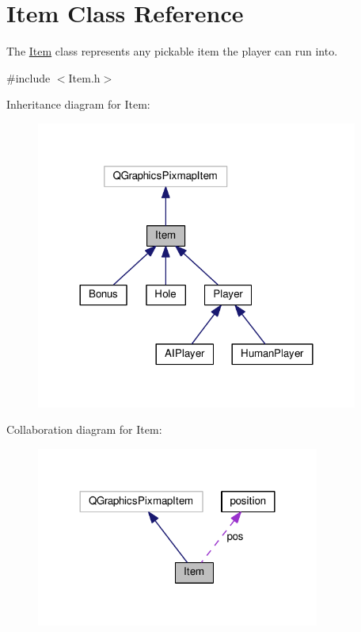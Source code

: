 \hypertarget{class_item}{}\section{Item Class Reference}
\label{class_item}


The \hyperlink{class_item}{Item} class represents any pickable item the player can run into.  




{\ttfamily \#include $<$Item.\+h$>$}



Inheritance diagram for Item\+:
\nopagebreak
\begin{figure}[H]
\begin{center}
\leavevmode
\includegraphics[width=300pt]{class_item__inherit__graph}
\end{center}
\end{figure}


Collaboration diagram for Item\+:
\nopagebreak
\begin{figure}[H]
\begin{center}
\leavevmode
\includegraphics[width=264pt]{class_item__coll__graph}
\end{center}
\end{figure}
